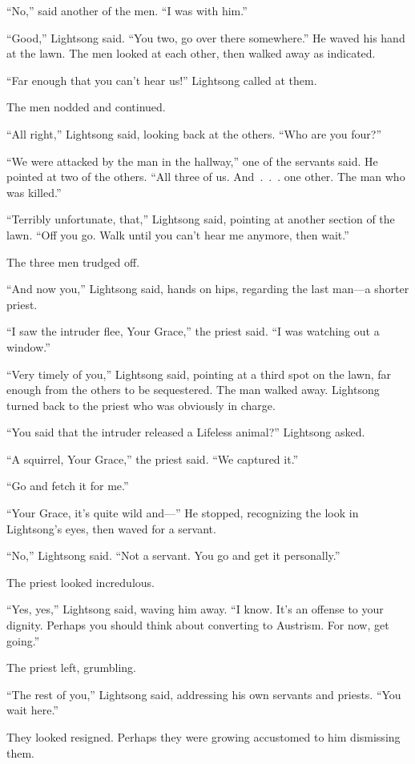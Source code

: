 “No,” said another of the men. “I was with him.”

“Good,” Lightsong said. “You two, go over there somewhere.” He waved his hand at the lawn. The men looked at each other, then walked away as indicated.

“Far enough that you can’t hear us!” Lightsong called at them.

The men nodded and continued.

“All right,” Lightsong said, looking back at the others. “Who are you four?”

“We were attacked by the man in the hallway,” one of the servants said. He pointed at two of the others. “All three of us. And~.~.~. one other. The man who was killed.”

“Terribly unfortunate, that,” Lightsong said, pointing at another section of the lawn. “Off you go. Walk until you can’t hear me anymore, then wait.”

The three men trudged off.

“And now you,” Lightsong said, hands on hips, regarding the last man—a shorter priest.

“I saw the intruder flee, Your Grace,” the priest said. “I was watching out a window.”

“Very timely of you,” Lightsong said, pointing at a third spot on the lawn, far enough from the others to be sequestered. The man walked away. Lightsong turned back to the priest who was obviously in charge.

“You said that the intruder released a Lifeless animal?” Lightsong asked.

“A squirrel, Your Grace,” the priest said. “We captured it.”

“Go and fetch it for me.”

“Your Grace, it’s quite wild and—” He stopped, recognizing the look in Lightsong’s eyes, then waved for a servant.

“No,” Lightsong said. “Not a servant. You go and get it personally.”

The priest looked incredulous.

“Yes, yes,” Lightsong said, waving him away. “I know. It’s an offense to your dignity. Perhaps you should think about converting to Austrism. For now, get going.”

The priest left, grumbling.

“The rest of you,” Lightsong said, addressing his own servants and priests. “You wait here.”

They looked resigned. Perhaps they were growing accustomed to him dismissing them.


